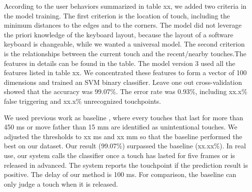 According to the user behaviors summarized in table xx, we added two criteria in the model training. The first criterion is the location of touch, including the minimum distances to the edges and to the corners. The model did not leverage the priori knowledge of the keyboard layout, because the layout of a software keyboard is changeable, while we wanted a universal model. The second criterion is the relationships between the current touch and the recent/nearby touches.The features in details can be found in the table. The model version 3 used all the features listed in table xx. We concentrated these features to form a vector of 100 dimensions and trained an SVM binary classifier. Leave one out cross-validation showed that the accuracy was 99.07\%. The error rate was 0.93\%, including xx.x\% false triggering and xx.x\% unrecognized touchpoints.

We used previous work as baseline \cite{2013-TapBoard}, where every touches that last for more than 450 ms or move father than 15 mm are identified as unintentional touches. We adjusted the thresholds to xx ms and xx mm so that the baseline performed the best on our dataset. Our result (99.07\%) surpassed the baseline (xx.xx\%). In real use, our system calls the classifier once a touch has lasted for five frames or is released in advanced. The system reports the touchpoint if the prediction result is positive. The delay of our method is 100 ms. For comparison, the baseline can only judge a touch when it is released.



